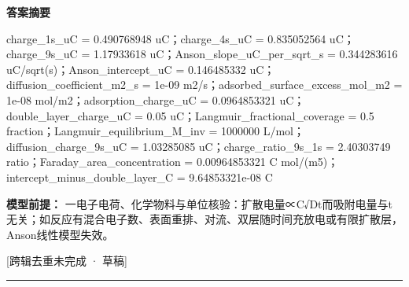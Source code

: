 \documentclass[UTF8,11pt,a4paper]{ctexart}
\begin{document}
\noindent\textbf{答案摘要}\par
charge\_1s\_uC = 0.490768948 uC；charge\_4s\_uC = 0.835052564 uC；charge\_9s\_uC = 1.17933618 uC；Anson\_slope\_uC\_per\_sqrt\_s = 0.344283616 uC/sqrt(s)；Anson\_intercept\_uC = 0.146485332 uC；diffusion\_coefficient\_m2\_s = 1e-09 m2/s；adsorbed\_surface\_excess\_mol\_m2 = 1e-08 mol/m2；adsorption\_charge\_uC = 0.0964853321 uC；double\_layer\_charge\_uC = 0.05 uC；Langmuir\_fractional\_coverage = 0.5 fraction；Langmuir\_equilibrium\_M\_inv = 1000000 L/mol；diffusion\_charge\_9s\_uC = 1.03285085 uC；charge\_ratio\_9s\_1s = 2.40303749 ratio；Faraday\_area\_concentration = 0.00964853321 C mol/(m5)；intercept\_minus\_double\_layer\_C = 9.64853321e-08 C\par
\noindent\textbf{模型前提：}
一电子电荷、化学物料与单位核验：扩散电量∝C√Dt而吸附电量与t无关；如反应有混合电子数、表面重排、对流、双层随时间充放电或有限扩散层，Anson线性模型失效。\par
\noindent\textcolor{red!65!black}{[跨辑去重未完成 · 草稿]} \par
\medskip\hrule\medskip
{}
\end{document}
